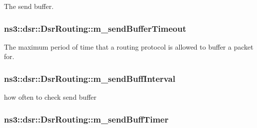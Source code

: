 The send buffer. 

\subsubsection[{\texorpdfstring{m\+\_\+send\+Buffer\+Timeout}{m_sendBufferTimeout}}]{ ns3\+::dsr\+::\+Dsr\+Routing\+::m\+\_\+send\+Buffer\+Timeout\hspace{0.3cm}{\ttfamily [private]}}\hypertarget{classns3_1_1dsr_1_1DsrRouting_a1f89794801db0336d92e4ca85fbc09a7}{}\label{classns3_1_1dsr_1_1DsrRouting_a1f89794801db0336d92e4ca85fbc09a7}


The maximum period of time that a routing protocol is allowed to buffer a packet for. 

\subsubsection[{\texorpdfstring{m\+\_\+send\+Buff\+Interval}{m_sendBuffInterval}}]{ ns3\+::dsr\+::\+Dsr\+Routing\+::m\+\_\+send\+Buff\+Interval\hspace{0.3cm}{\ttfamily [private]}}\hypertarget{classns3_1_1dsr_1_1DsrRouting_a966d7c644a941e3e6365859983816e8b}{}\label{classns3_1_1dsr_1_1DsrRouting_a966d7c644a941e3e6365859983816e8b}


how often to check send buffer 

\subsubsection[{\texorpdfstring{m\+\_\+send\+Buff\+Timer}{m_sendBuffTimer}}]{ ns3\+::dsr\+::\+Dsr\+Routing\+::m\+\_\+send\+Buff\+Timer\hspace{0.3cm}{\ttfamily [private]}}\hypertarget{classns3_1_1dsr_1_1DsrRouting_a7676aff7f691319b764fba26a726ef5d}{}\label{classns3_1_1dsr_1_1DsrRouting_a7676aff7f691319b764fba26a726ef5d}


